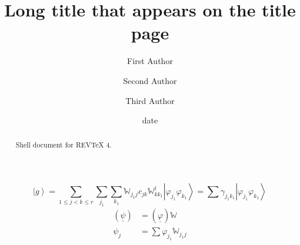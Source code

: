 \documentclass[aps,preprint]{revtex4}%
\begin{document}
\title[Short title for running header]{Long title that appears on the title page}
\author{First Author}
\author{Second Author}
\author{Third Author}

\begin{abstract}
Shell document for REV\TeX{} 4.

\end{abstract}
\date[Date text]{date}




\maketitle
\tableofcontents
%

\begin{equation}
\left\vert g\right\rangle =\sum_{1\leq j<k\leq r}\sum_{j_{1}}\sum_{k_{1}%
}\mathbb{W}_{j_{1}j}c_{jk}\mathbb{W}_{kk_{1}}^{t}\left\vert \varphi_{j_{1}%
}\varphi_{k_{1}}\right\rangle =\sum\gamma_{j_{1}k_{1}}\left\vert
\varphi_{j_{1}}\varphi_{k_{1}}\right\rangle
\end{equation}%
\begin{align}
\left(  \underline{\psi}\right)    & =\left(  \underline{\varphi}\right)
\mathbb{W}\\
\psi_{j}  & =\sum\varphi_{j_{1}}\mathbb{W}_{j_{1}j}%
\end{align}
\end{document}

